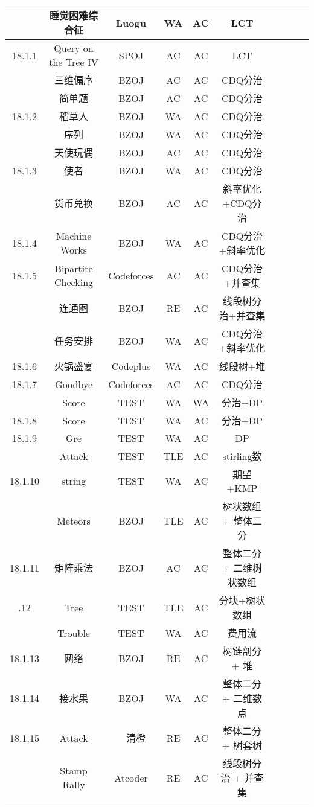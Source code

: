 \documentclass[landscape]{article}
\begin{document}
\begin{longtable}{cccccccccc}
  & 睡觉困难综合征 & Luogu & WA & AC & LCT\\
  \hline
  18.1.1 & Query on the Tree IV & SPOJ & AC & AC & LCT\\
  & 三维偏序 & BZOJ & AC & AC & CDQ分治\\
  & 简单题 & BZOJ & AC & AC & CDQ分治\\
  \hline
  18.1.2 & 稻草人 & BZOJ & WA & AC & CDQ分治\\
  & 序列 & BZOJ & WA & AC & CDQ分治\\
  & 天使玩偶 & BZOJ & AC & AC & CDQ分治\\
  \hline
  18.1.3 & 使者 & BZOJ & WA & AC & CDQ分治\\
  & 货币兑换 & BZOJ & AC & AC & 斜率优化+CDQ分治\\
  \hline
  18.1.4 & Machine Works & BZOJ & WA & AC & CDQ分治+斜率优化\\
  \hline
  18.1.5 & Bipartite Checking & Codeforces & AC & AC & CDQ分治+并查集\\
  & 连通图 & BZOJ & RE & AC & 线段树分治+并查集\\
  & 任务安排 & BZOJ & WA & AC & CDQ分治+斜率优化\\
  \hline
  18.1.6 & 火锅盛宴 & Codeplus & WA & AC & 线段树+堆\\
  \hline
  18.1.7 & Goodbye & Codeforces & AC & AC & CDQ分治\\
  & Score & TEST & WA & WA & 分治+DP\\
  \hline
  18.1.8 & Score & TEST & WA & AC & 分治+DP\\
  \hline
  18.1.9 & Gre & TEST & WA & AC & DP\\
  & Attack & TEST & TLE & AC & stirling数\\
  \hline
  18.1.10 & string & TEST & WA & AC & 期望+KMP\\
  & Meteors & BZOJ & TLE & AC & 树状数组 + 整体二分\\
  \hline
  18.1.11 & 矩阵乘法 & BZOJ & AC & AC & 整体二分 + 二维树状数组\\
  \newpage
  \hline
  18.1.12 & Tree & TEST & TLE & AC & 分块+树状数组\\
  & Trouble & TEST & WA & AC & 费用流\\
  \hline
  18.1.13 & 网络 & BZOJ & RE & AC & 树链剖分 + 堆\\
  \hline
  18.1.14 & 接水果 & BZOJ & WA & AC & 整体二分 + 二维数点\\
  \hline
  18.1.15 & Attack &　清橙 & RE & AC & 整体二分 + 树套树\\
  & Stamp Rally & Atcoder & RE & AC & 线段树分治 + 并查集\\

\end{longtable}
\end{document}
